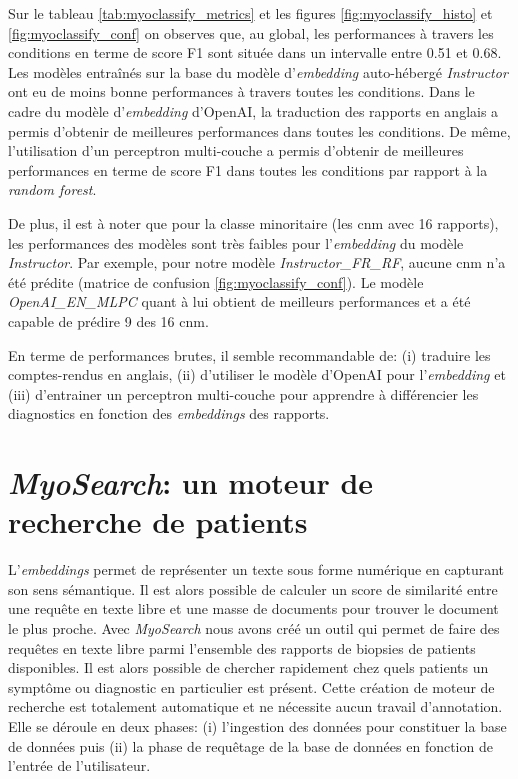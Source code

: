 Sur le tableau \ref{tab:myoclassify_metrics} et les figures \ref{fig:myoclassify_histo} et \ref{fig:myoclassify_conf} on observes que, au global, les performances à travers les conditions en terme de score F1 sont située dans un intervalle entre 0.51 et 0.68. Les modèles entraînés sur la base du modèle d'\textit{embedding} auto-hébergé \textit{Instructor} ont eu de moins bonne performances à travers toutes les conditions. Dans le cadre du modèle d'\textit{embedding} d'OpenAI, la traduction des rapports en anglais a permis d'obtenir de meilleures performances dans toutes les conditions. De même, l'utilisation d'un perceptron multi-couche a permis d'obtenir de meilleures performances en terme de score F1 dans toutes les conditions par rapport à la \textit{random forest}.

De plus, il est à noter que pour la classe minoritaire (les \gls{cnm} avec 16 rapports), les performances des modèles sont très faibles pour l'\textit{embedding} du modèle \textit{Instructor}. Par exemple, pour notre modèle \textit{Instructor\_FR\_RF}, aucune \gls{cnm} n'a été prédite (matrice de confusion \ref{fig:myoclassify_conf}). Le modèle \textit{OpenAI\_EN\_MLPC} quant à lui obtient de meilleurs performances et a été capable de prédire 9 des 16 \gls{cnm}. 

En terme de performances brutes, il semble recommandable de: (i) traduire les comptes-rendus en anglais, (ii) d'utiliser le modèle d'OpenAI pour l'\textit{embedding} et (iii) d'entrainer un perceptron multi-couche pour apprendre à différencier les diagnostics en fonction des \textit{embeddings} des rapports. 

\section{\textit{MyoSearch}: un moteur de recherche de patients}
L'\textit{embeddings} permet de représenter un texte sous forme numérique en capturant son sens sémantique. Il est alors possible de calculer un score de similarité entre une requête en texte libre et une masse de documents pour trouver le document le plus proche. Avec \textit{MyoSearch} nous avons créé un outil qui permet de faire des requêtes en texte libre parmi l'ensemble des rapports de biopsies de patients disponibles. Il est alors possible de chercher rapidement chez quels patients un symptôme ou diagnostic en particulier est présent. Cette création de moteur de recherche est totalement automatique et ne nécessite aucun travail d'annotation. Elle se déroule en deux phases: (i) l'ingestion des données pour constituer la base de données puis (ii) la phase de requêtage de la base de données en fonction de l'entrée de l'utilisateur.

